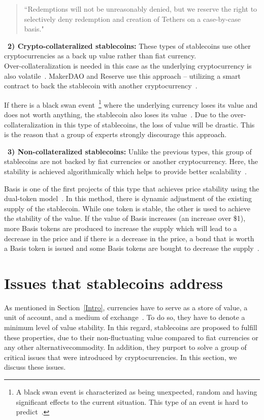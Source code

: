 \begin{quote}
``Redemptions will not be unreasonably denied, but we reserve the right to selectively deny redemption and creation of Tethers on a case-by-case basis."
\end{quote}


~\textbf{2) Crypto-collateralized stablecoins:} These types of stablecoins use other cryptocurrencies as a back up value rather than fiat currency. \\ Over-collateralization is needed in this case as the underlying cryptocurrency is also volatile~\cite{linkedin}. MakerDAO and Reserve use this approach -- utilizing a smart contract to back the stablecoin with another cryptocurrency~\cite{cointelegraph}.

If there is a black swan event~\footnote{A black swan event is characterized as being unexpected, random and having significant effects to the current situation. This type of an event is hard to predict~\cite{swan}.} where the underlying currency loses its value and does not worth anything, the stablecoin also loses its value~\cite{coinsexplained}.  Due to the over-collateralization in this type of stablecoins, the loss of value will be drastic. This is the reason that a group of experts strongly discourage this approach.

~\textbf{3) Non-collateralized stablecoins:} Unlike the previous types, this group of stablecoins are not backed by fiat currencies or another cryptocurrency. Here, the stability is achieved algorithmically which helps to provide better scalability~\cite{report}.

Basis is one of the first projects of this type that achieves price stability using the dual-token model~\cite{cryptoinsider}. In this method, there is dynamic adjustment of the existing supply of the stablecoin. While one token is stable, the other is used to achieve the stability of the value. If the value of Basis increases (an increase over \$1), more Basis tokens are produced to increase the supply which will lead to a decrease in the price and if there is a decrease in the price, a bond that is worth a Basis token is issued and some Basis tokens are bought to decrease the supply~\cite{euromoney}.


\section{Issues that stablecoins address}
As mentioned in Section~\ref{Intro}, currencies have to serve as a store of value, a unit of account, and a medium of exchange~\cite{smithin2002money}. To do so, they have to denote a minimum level of value stability. In this regard, stablecoins are proposed to fulfill these properties, due to their non-fluctuating value compared to fiat currencies or any other alternative\eg commodity. In addition, they purport to solve a group of critical issues that were introduced by cryptocurrencies. In this section, we discuss these issues.

